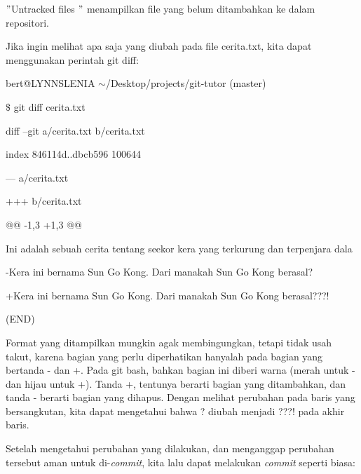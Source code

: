 \noindent 
$ " $Untracked files $ " $ menampilkan file yang belum ditambahkan ke dalam repositori.
 \par
\noindent 
Jika ingin melihat apa saja yang diubah pada file {\fontsize{10pt}{10pt}\selectfont cerita.txt, kita dapat menggunakan perintah git diff:} \par
\noindent 
{\fontsize{10pt}{10pt}\selectfont bert@LYNNSLENIA  $  \sim  $/Desktop/projects/git-tutor (master)} \par
\noindent 
{\fontsize{10pt}{10pt}\selectfont  $  \$  $ git diff cerita.txt} \par
\noindent 
{\fontsize{10pt}{10pt}\selectfont diff --git a/cerita.txt b/cerita.txt} \par
\noindent 
{\fontsize{10pt}{10pt}\selectfont index 846114d..dbcb596 100644} \par
\noindent 
{\fontsize{10pt}{10pt}\selectfont --- a/cerita.txt} \par
\noindent 
{\fontsize{10pt}{10pt}\selectfont +++ b/cerita.txt} \par
\noindent 
{\fontsize{10pt}{10pt}\selectfont @@ -1,3 +1,3 @@} \par
\noindent 
{\fontsize{10pt}{10pt}\selectfont  Ini adalah sebuah cerita tentang seekor kera yang terkurung dan terpenjara dala} \par
\noindent 
\vspace{10pt}
\noindent 
{\fontsize{10pt}{10pt}\selectfont -Kera ini bernama Sun Go Kong. Dari manakah Sun Go Kong berasal?} \par
\noindent 
{\fontsize{10pt}{10pt}\selectfont +Kera ini bernama Sun Go Kong. Dari manakah Sun Go Kong berasal???!} \par
\noindent 
{\fontsize{10pt}{10pt}\selectfont (END)} \par
\vspace{12pt}
\hspace*{0.50in} Format yang ditampilkan mungkin agak membingungkan, tetapi tidak usah takut, karena bagian yang perlu diperhatikan hanyalah pada bagian yang bertanda - dan +. Pada git bash, bahkan bagian ini diberi warna (merah untuk - dan hijau untuk +). Tanda +, tentunya berarti bagian yang ditambahkan, dan tanda - berarti bagian yang dihapus. Dengan melihat perubahan pada baris yang bersangkutan, kita dapat mengetahui bahwa ? diubah menjadi ???! pada akhir baris. \par
\hspace*{0.50in} Setelah mengetahui perubahan yang dilakukan, dan menganggap perubahan tersebut aman untuk di-\emph{commit}, kita lalu dapat melakukan \emph{commit} seperti biasa: \par

